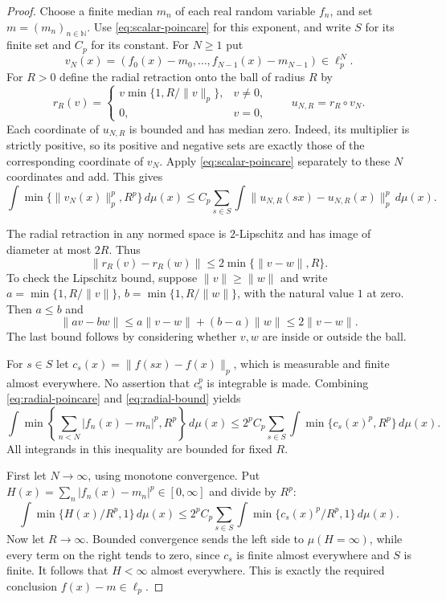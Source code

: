 \documentclass[11pt]{article}
\numberwithin{equation}{section}
\theoremstyle{definition}
\newcommand{\N}{\mathbb N}
\begin{document}
\begin{proof}
Choose a finite median $m_n$ of each real random variable $f_n$,
and set $m=(m_n)_{n\in\N}$.
Use \eqref{eq:scalar-poincare} for this exponent, and write $S$
for its finite set and $C_p$ for its constant.
For $N\ge1$ put
\[
 v_N(x)=(f_0(x)-m_0,\ldots,f_{N-1}(x)-m_{N-1})\in\ell_p^N.
\]
For $R>0$ define the radial retraction onto the ball of radius $R$ by
\[
 r_R(v)=
 \begin{cases}
 v\min\{1,R/\|v\|_p\},&v\ne0,\\
 0,&v=0,
 \end{cases}
 \qquad u_{N,R}=r_R\circ v_N .
\]
Each coordinate of $u_{N,R}$ is bounded and has median zero.
Indeed, its multiplier is strictly positive, so its positive
and negative sets are exactly those of the corresponding coordinate
of $v_N$.
Apply \eqref{eq:scalar-poincare} separately to these $N$ coordinates
and add. This gives
\begin{equation}\label{eq:radial-poincare}
 \int\min\{\|v_N(x)\|_p^p,R^p\}\,d\mu(x)
 \le C_p\sum_{s\in S}
      \int\|u_{N,R}(sx)-u_{N,R}(x)\|_p^p\,d\mu(x).
\end{equation}

The radial retraction in any normed space is $2$-Lipschitz and
has image of diameter at most $2R$. Thus
\begin{equation}\label{eq:radial-bound}
 \|r_R(v)-r_R(w)\|
      \le2\min\{\|v-w\|,R\}.
\end{equation}
To check the Lipschitz bound, suppose $\|v\|\ge\|w\|$ and write
$a=\min\{1,R/\|v\|\}$, $b=\min\{1,R/\|w\|\}$, with the
natural value $1$ at zero. Then $a\le b$ and
\[
 \|av-bw\|\le a\|v-w\|+(b-a)\|w\|
              \le2\|v-w\|.
\]
The last bound follows by considering whether $v,w$ are inside
or outside the ball.

For $s\in S$ let
$c_s(x)=\|f(sx)-f(x)\|_p$, which is measurable and finite
almost everywhere. No assertion that $c_s^p$ is integrable is made.
Combining \eqref{eq:radial-poincare} and
\eqref{eq:radial-bound} yields
\begin{equation}\label{eq:truncated-energy}
 \int\min\left\{\sum_{n<N}|f_n(x)-m_n|^p,R^p\right\}\,d\mu(x)
 \le 2^p C_p\sum_{s\in S}
           \int\min\{c_s(x)^p,R^p\}\,d\mu(x).
\end{equation}
All integrands in this inequality are bounded for fixed $R$.

First let $N\to\infty$, using monotone convergence. Put
$H(x)=\sum_n|f_n(x)-m_n|^p\in[0,\infty]$ and divide by $R^p$:
\[
 \int\min\{H(x)/R^p,1\}\,d\mu(x)
 \le 2^pC_p\sum_{s\in S}
       \int\min\{c_s(x)^p/R^p,1\}\,d\mu(x).
\]
Now let $R\to\infty$. Bounded convergence sends the left side
to $\mu(H=\infty)$, while every term on the right tends to zero,
since $c_s$ is finite almost everywhere and $S$ is finite.
It follows that $H<\infty$ almost everywhere. This is exactly
the required conclusion $f(x)-m\in\ell_p$.
\end{proof}
\end{document}
